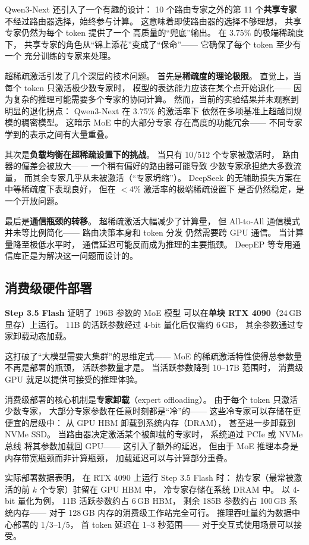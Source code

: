 Qwen3-Next 还引入了一个有趣的设计：
10 个路由专家之外的第 11 个\textbf{共享专家}
不经过路由器选择，始终参与计算。
这意味着即使路由器的选择不够理想，
共享专家仍然为每个 token 提供了一个
高质量的“兜底”输出。
在 3.75\% 的极端稀疏度下，
共享专家的角色从“锦上添花”变成了“保命”——
它确保了每个 token 至少有一个
充分训练的专家来处理。

超稀疏激活引发了几个深层的技术问题。
首先是\textbf{稀疏度的理论极限}。
直觉上，当每个 token 只激活极少数专家时，
模型的表达能力应该在某个点开始退化——
因为复杂的推理可能需要多个专家的协同计算。
然而，当前的实验结果并未观察到明显的退化拐点：
Qwen3-Next 在 3.75\% 的激活率下
依然在多项基准上超越同规模的稠密模型。
这暗示 MoE 中的大部分专家
存在高度的功能冗余——
不同专家学到的表示之间有大量重叠。

其次是\textbf{负载均衡在超稀疏设置下的挑战}。
当只有 10/512 个专家被激活时，
路由器的偏差会被放大——
一个稍有偏好的路由器可能导致
少数专家承担绝大多数流量，
而其余专家几乎从未被激活（“专家坍缩”）。
DeepSeek 的无辅助损失方案在中等稀疏度下表现良好，
但在 $<$4\% 激活率的极端稀疏设置下
是否仍然稳定，是一个开放问题。

最后是\textbf{通信瓶颈的转移}。
超稀疏激活大幅减少了计算量，
但 All-to-All 通信模式并未等比例简化——
路由决策本身和 token 分发
仍然需要跨 GPU 通信。
当计算量降至极低水平时，
通信延迟可能反而成为推理的主要瓶颈。
DeepEP 等专用通信库正是为解决这一问题而设计的。

\subsection{消费级硬件部署}

\textbf{Step 3.5 Flash} 证明了 196B 参数的 MoE 模型
可以在\textbf{单块 RTX 4090}（24\,GB 显存）上运行。
11B 的活跃参数经过 4-bit 量化后仅需约 6\,GB，
其余参数通过专家卸载动态加载。

这打破了“大模型需要大集群”的思维定式——
MoE 的稀疏激活特性使得总参数量不再是部署的瓶颈，
活跃参数量才是。
当活跃参数降到 10--17B 范围时，
消费级 GPU 就足以提供可接受的推理体验。

消费级部署的核心机制是\textbf{专家卸载}（expert offloading）。
由于每个 token 只激活少数专家，
大部分专家参数在任意时刻都是“冷”的——
这些冷专家可以存储在更便宜的层级中：
从 GPU HBM 卸载到系统内存（DRAM），
甚至进一步卸载到 NVMe SSD。
当路由器决定激活某个被卸载的专家时，
系统通过 PCIe 或 NVMe 总线
将其参数加载回 GPU——
这引入了额外的延迟，
但由于 MoE 推理本身是内存带宽瓶颈而非计算瓶颈，
加载延迟可以与计算部分重叠。

实际部署数据表明，
在 RTX 4090 上运行 Step 3.5 Flash 时：
热专家（最常被激活的前 $k$ 个专家）驻留在 GPU HBM 中，
冷专家存储在系统 DRAM 中。
以 4-bit 量化为例，
11B 活跃参数约占 6\,GB HBM，
剩余 185B 参数约占 100\,GB 系统内存——
对于 128\,GB 内存的消费级工作站完全可行。
推理吞吐量约为数据中心部署的 1/3--1/5，
首 token 延迟在 1--3 秒范围——
对于交互式使用场景可以接受。

